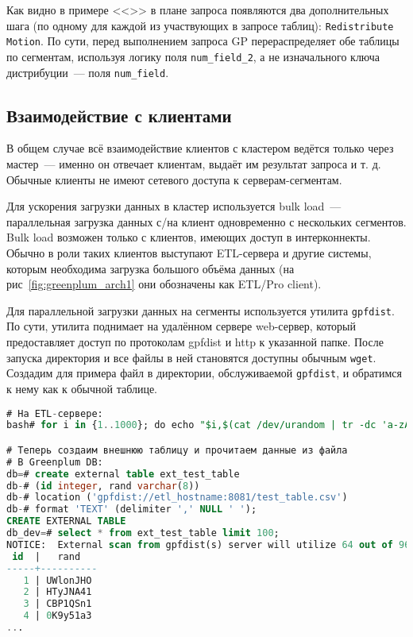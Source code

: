 Как видно в примере <<>> в плане запроса появляются два дополнительных шага (по одному для каждой из участвующих в запросе таблиц): \lstinline!Redistribute Motion!. По сути, перед выполнением запроса GP перераспределяет обе таблицы по сегментам, используя логику поля \lstinline!num_field_2!, а не изначального ключа дистрибуции~--- поля \lstinline!num_field!.


\subsection{Взаимодействие с клиентами}

В общем случае всё взаимодействие клиентов с кластером ведётся только через мастер~--- именно он отвечает клиентам, выдаёт им результат запроса и т. д. Обычные клиенты не имеют сетевого доступа к серверам-сегментам.

Для ускорения загрузки данных в кластер используется bulk load~--- параллельная загрузка данных с/на клиент одновременно с нескольких сегментов. Bulk load возможен только с клиентов, имеющих доступ в интерконнекты. Обычно в роли таких клиентов выступают ETL-сервера и другие системы, которым необходима загрузка большого объёма данных (на рис~\ref{fig:greenplum_arch1} они обозначены как ETL/Pro client).

Для параллельной загрузки данных на сегменты используется утилита \lstinline!gpfdist!. По сути, утилита поднимает на удалённом сервере web-сервер, который предоставляет доступ по протоколам gpfdist и http к указанной папке. После запуска директория и все файлы в ней становятся доступны обычным \lstinline!wget!. Создадим для примера файл в директории, обслуживаемой \lstinline!gpfdist!, и обратимся к нему как к обычной таблице.

\begin{lstlisting}[language=SQL,label=lst:greenplum_example4,caption=Пример с gpfdist]
# На ETL-сервере:
bash# for i in {1..1000}; do echo "$i,$(cat /dev/urandom | tr -dc 'a-zA-Z0-9' | fold -w 8 | head -n 1)"; done > /tmp/work/gpfdist_home/test_table.csv

# Теперь создаим внешнюю таблицу и прочитаем данные из файла
# В Greenplum DB:
db=# create external table ext_test_table
db-# (id integer, rand varchar(8))
db-# location ('gpfdist://etl_hostname:8081/test_table.csv')
db-# format 'TEXT' (delimiter ',' NULL ' ');
CREATE EXTERNAL TABLE
db_dev=# select * from ext_test_table limit 100;
NOTICE:  External scan from gpfdist(s) server will utilize 64 out of 96 segment databases
 id  |   rand
-----+----------
   1 | UWlonJHO
   2 | HTyJNA41
   3 | CBP1QSn1
   4 | 0K9y51a3
...
\end{lstlisting}

